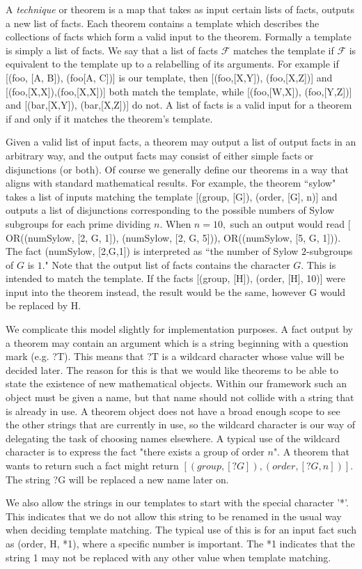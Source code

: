 \documentclass[11pt, oneside]{article}   	%
\begin{document}
A \textit{technique} or theorem is a map that takes as input certain lists of facts, outputs a new list of facts.  Each theorem contains a template which describes the collections of facts which form a valid input to the theorem.  Formally a template is simply a list of facts.  We say that a list of facts $\mathcal{F}$ matches the template if $\mathcal{F}$ is equivalent to the template up to a relabelling of its arguments.  For example if [(foo, [A, B]), (foo[A, C])] is our template, then [(foo,[X,Y]), (foo,[X,Z])] and [(foo,[X,X]),(foo,[X,X])] both match the template, while [(foo,[W,X]), (foo,[Y,Z])] and [(bar,[X,Y]), (bar,[X,Z])] do not.  A list of facts is a valid input for a theorem if and only if it matches the theorem's template.  

Given a valid list of input facts, a theorem may output a list of output facts in an arbitrary way, and the output facts may consist of either simple facts or disjunctions (or both).  Of course we generally define our theorems in a way that aligns with standard mathematical results.  For example, the theorem ``sylow" takes a list of inputs matching the template [(group, [G]), (order, [G], n)] and outputs a list of disjunctions corresponding to the possible numbers of Sylow subgroups for each prime dividing $n$.  When $n=10,$ such an output would read [ OR((numSylow, [2, G, 1]), (numSylow, [2, G, 5])), OR((numSylow, [5, G, 1])). The fact (numSylow, [2,G,1]) is interpreted as ``the number of Sylow $2$-subgroups of $G$ is $1$."  Note that the output list of facts contains the character $G$.  This is intended to match the template.  If the facts [(group, [H]), (order, [H], 10)] were input into the theorem instead, the result would be the same, however G would be replaced by H.

We complicate this model slightly for implementation purposes.  A fact output by a theorem may contain an argument which is a string beginning with a question mark (e.g. ?T).  This means that ?T is a wildcard character whose value will be decided later.   The reason for this is that we would like theorems to be able to state the existence of new mathematical objects.  Within our framework such an object must be given a name, but that name should not collide with a string that is already in use.  A theorem object does not have a broad enough scope to see the other strings that are currently in use, so the wildcard character is our way of delegating the task of choosing names elsewhere.  A typical use of the wildcard character is to express the fact "there exists a group of order $n$".  A theorem that wants to return such a fact might return $[(group, [?G]), (order,[?G,n])].$  The string ?G will be replaced a new name later on.

We also allow the strings in our templates to start with the special character '*'. This indicates that we do not allow this string to be renamed in the usual way when deciding template matching.  The typical use of this is for an input fact such as (order, H, *1), where a specific number is important. The *1 indicates that the string 1 may not be replaced with any other value when template matching.
\end{document}
